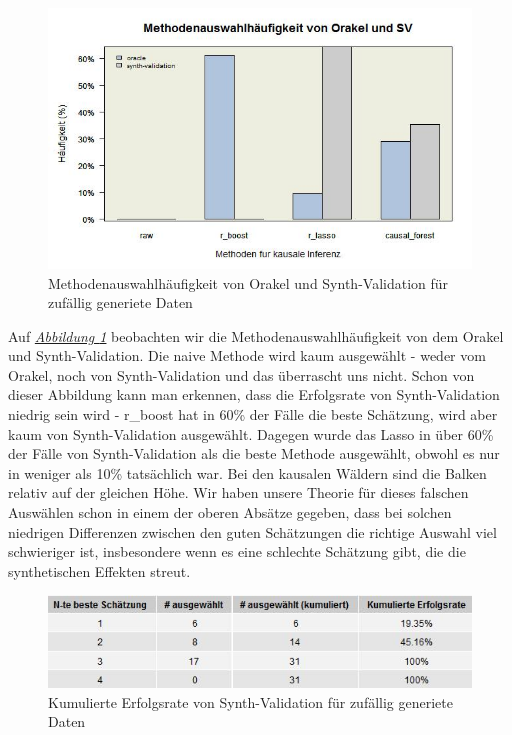\documentclass[12pt,a4paper,twoside]{scrartcl}
\numberwithin{equation}{section}
\newcommand{\reffig}[1]{\emph{\hyperref[#1]{Abbildung \ref*{#1}}}}
\begin{document}
\begin{center}
\begin{figure}[h]
    \centering
    \includegraphics[height=0.5\textwidth, width=1\textwidth]{figures/plots/randomBarplot.jpeg}
    \caption[Methodenauswahlhäufigkeit von Orakel und Synth-Validation für zufällig generiete Daten]{Methodenauswahlhäufigkeit von Orakel und Synth-Validation für zufällig generiete Daten}\label{fig:randomBarplot}
  \end{figure}
\end{center}

\noindent
Auf \reffig{fig:randomBarplot} beobachten wir die Methodenauswahlhäufigkeit von dem Orakel und Synth-Validation. Die naive Methode wird kaum ausgewählt - weder vom Orakel, noch von Synth-Validation und das überrascht uns nicht. Schon von dieser Abbildung kann man erkennen, dass die Erfolgsrate von Synth-Validation niedrig sein wird - r\_boost hat in 60\% der Fälle die beste Schätzung, wird aber kaum von Synth-Validation ausgewählt. Dagegen wurde das Lasso in über 60\% der Fälle von Synth-Validation als die beste Methode ausgewählt, obwohl es nur in weniger als 10\% tatsächlich war. Bei den kausalen Wäldern sind die Balken relativ auf der gleichen Höhe. Wir haben unsere Theorie für dieses falschen Auswählen schon in einem der oberen Absätze gegeben, dass bei solchen niedrigen Differenzen zwischen den guten Schätzungen die richtige Auswahl viel schwieriger ist, insbesondere wenn es eine schlechte Schätzung gibt, die die synthetischen Effekten streut.\par   

\begin{center}
\begin{figure}[h]
    \centering
    \includegraphics[height=0.2\textwidth, width=1\textwidth]{figures/plots/randomGrid.jpeg}
    \caption[Kumulierte Erfolgsrate von Synth-Validation für zufällig generiete Daten]{Kumulierte Erfolgsrate von Synth-Validation für zufällig generiete Daten}\label{fig:randomGrid}
  \end{figure}
\end{center}
\end{document}
